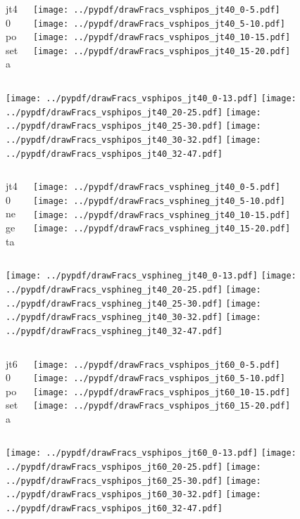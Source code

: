 \documentclass[aspectratio=169]{beamer}
\begin{document}
\begin{figure}[p]
\flushleft
\begin{columns}[T]
\begin{column}{.2\linewidth}
\centering
jt40 poseta
\end{column}
\begin{column}{.8\linewidth}
\texttt{[image: ../pypdf/drawFracs\_vsphipos\_jt40\_0-5.pdf]}
\texttt{[image: ../pypdf/drawFracs\_vsphipos\_jt40\_5-10.pdf]}
\texttt{[image: ../pypdf/drawFracs\_vsphipos\_jt40\_10-15.pdf]}
\texttt{[image: ../pypdf/drawFracs\_vsphipos\_jt40\_15-20.pdf]}
\end{column}
\end{columns}
\texttt{[image: ../pypdf/drawFracs\_vsphipos\_jt40\_0-13.pdf]}
\texttt{[image: ../pypdf/drawFracs\_vsphipos\_jt40\_20-25.pdf]}
\texttt{[image: ../pypdf/drawFracs\_vsphipos\_jt40\_25-30.pdf]}
\texttt{[image: ../pypdf/drawFracs\_vsphipos\_jt40\_30-32.pdf]}
\texttt{[image: ../pypdf/drawFracs\_vsphipos\_jt40\_32-47.pdf]}
\end{figure}
\begin{figure}[p]
\flushleft
\begin{columns}[T]
\begin{column}{.2\linewidth}
\centering
jt40 negeta
\end{column}
\begin{column}{.8\linewidth}
\texttt{[image: ../pypdf/drawFracs\_vsphineg\_jt40\_0-5.pdf]}
\texttt{[image: ../pypdf/drawFracs\_vsphineg\_jt40\_5-10.pdf]}
\texttt{[image: ../pypdf/drawFracs\_vsphineg\_jt40\_10-15.pdf]}
\texttt{[image: ../pypdf/drawFracs\_vsphineg\_jt40\_15-20.pdf]}
\end{column}
\end{columns}
\texttt{[image: ../pypdf/drawFracs\_vsphineg\_jt40\_0-13.pdf]}
\texttt{[image: ../pypdf/drawFracs\_vsphineg\_jt40\_20-25.pdf]}
\texttt{[image: ../pypdf/drawFracs\_vsphineg\_jt40\_25-30.pdf]}
\texttt{[image: ../pypdf/drawFracs\_vsphineg\_jt40\_30-32.pdf]}
\texttt{[image: ../pypdf/drawFracs\_vsphineg\_jt40\_32-47.pdf]}
\end{figure}

\begin{figure}[p]
\flushleft
\begin{columns}[T]
\begin{column}{.2\linewidth}
\centering
jt60 poseta
\end{column}
\begin{column}{.8\linewidth}
\texttt{[image: ../pypdf/drawFracs\_vsphipos\_jt60\_0-5.pdf]}
\texttt{[image: ../pypdf/drawFracs\_vsphipos\_jt60\_5-10.pdf]}
\texttt{[image: ../pypdf/drawFracs\_vsphipos\_jt60\_10-15.pdf]}
\texttt{[image: ../pypdf/drawFracs\_vsphipos\_jt60\_15-20.pdf]}
\end{column}
\end{columns}
\texttt{[image: ../pypdf/drawFracs\_vsphipos\_jt60\_0-13.pdf]}
\texttt{[image: ../pypdf/drawFracs\_vsphipos\_jt60\_20-25.pdf]}
\texttt{[image: ../pypdf/drawFracs\_vsphipos\_jt60\_25-30.pdf]}
\texttt{[image: ../pypdf/drawFracs\_vsphipos\_jt60\_30-32.pdf]}
\texttt{[image: ../pypdf/drawFracs\_vsphipos\_jt60\_32-47.pdf]}
\end{figure}
\end{document}
